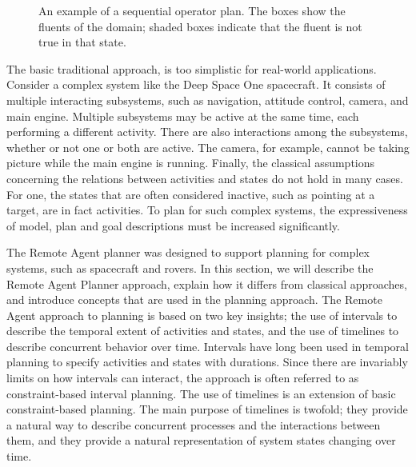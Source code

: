 
\begin{figure}[btph]
\centerline{ }
\caption{\label{classicPlan} An example of a sequential operator plan. 
The boxes show the fluents of the domain; shaded boxes indicate that 
the fluent is not true in that state.}
\end{figure}

The basic traditional approach, is too simplistic for real-world
applications.  Consider a complex system like the Deep Space One
spacecraft.  It consists of multiple interacting subsystems, such as
navigation, attitude control, camera, and main engine.  Multiple
subsystems may be active at the same time, each performing a different
activity.  There are also interactions among the subsystems, whether
or not one or both are active.  The camera, for example, cannot be
taking picture while the main engine is running.  Finally, the
classical assumptions concerning the relations between activities and
states do not hold in many cases.  For one, the states that are often
considered inactive, such as pointing at a target, are in fact
activities.  To plan for such complex systems, the expressiveness of
model, plan and goal descriptions must be increased significantly.





The Remote Agent planner was designed to support planning for complex
systems, such as spacecraft and rovers.  In this section, we will
describe the Remote Agent Planner approach, explain how it differs
from classical approaches, and introduce concepts that are used in the
planning approach.  The Remote Agent approach to planning is based on
two key insights; the use of intervals to describe the temporal extent
of activities and states, and the use of timelines to describe
concurrent behavior over time.  Intervals have long been used in
temporal planning to specify activities and states with durations.
Since there are invariably limits on how intervals can interact, the
approach is often referred to as {constraint-based interval planning}.
The use of timelines is an extension of basic constraint-based
planning.  The main purpose of timelines is twofold; they provide a
natural way to describe concurrent processes and the interactions
between them, and they provide a natural representation of system
states changing over time.



